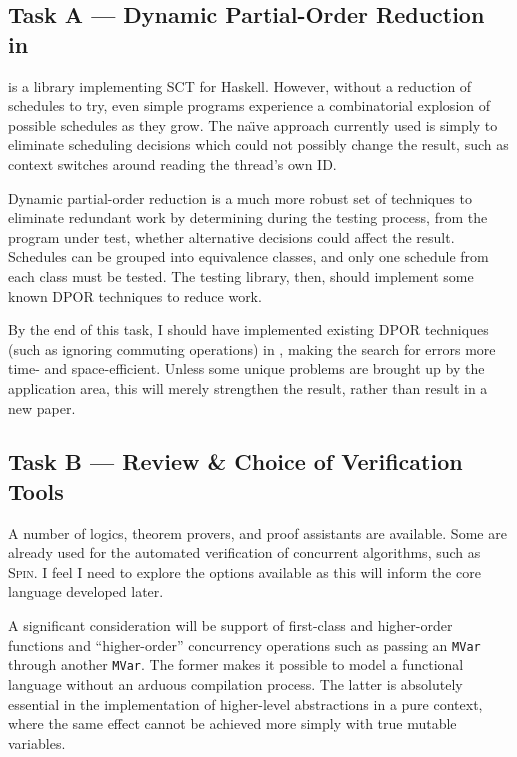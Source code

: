 \subsection*{Task A --- Dynamic Partial-Order Reduction in \dejafu{}}
\label{sec:proposal-tasks-dpor}

\dejafu{} is a library implementing SCT for Haskell. However, without
a reduction of schedules to try, even simple programs experience a
combinatorial explosion of possible schedules as they grow. The
na\"{\i}ve approach currently used is simply to eliminate scheduling
decisions which could not possibly change the result, such as context
switches around reading the thread's own ID.

Dynamic partial-order reduction is a much more robust set of
techniques to eliminate redundant work by determining during the
testing process, from the program under test, whether alternative
decisions could affect the result. Schedules can be grouped into
equivalence classes, and only one schedule from each class must be
tested. The testing library, then, should implement some known DPOR
techniques to reduce work.

By the end of this task, I should have implemented existing DPOR
techniques (such as ignoring commuting operations) in \dejafu{},
making the search for errors more time- and space-efficient. Unless
some unique problems are brought up by the application area, this will
merely strengthen the \dejafu{} result, rather than result in a new
paper.

\subsection*{Task B --- Review \& Choice of Verification Tools}
\label{sec:proposal-tasks-tools}

A number of logics, theorem provers, and proof assistants are
available. Some are already used for the automated verification of
concurrent algorithms, such as \textsc{Spin}. I feel I need to explore
the options available as this will inform the core language developed
later.

A significant consideration will be support of first-class and
higher-order functions and ``higher-order'' concurrency operations
such as passing an \verb|MVar| through another \verb|MVar|. The former
makes it possible to model a functional language without an arduous
compilation process. The latter is absolutely essential in the
implementation of higher-level abstractions in a pure context, where
the same effect cannot be achieved more simply with true mutable
variables.

